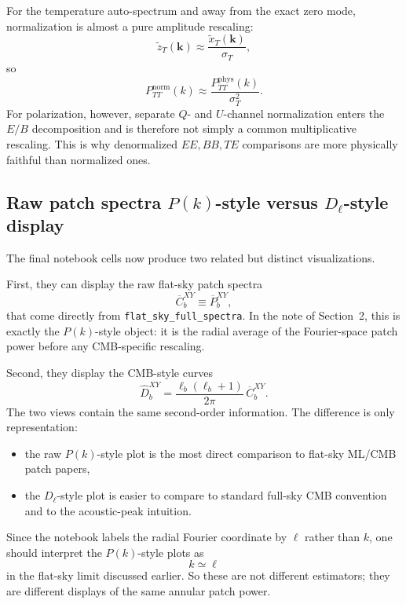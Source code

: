\documentclass[11pt]{article}
\begin{document}
For the temperature auto-spectrum and away from the exact zero mode, normalization is almost a pure amplitude rescaling:
\begin{equation}
  \widetilde z_T(\bm{k})
  \approx
  \frac{\widetilde x_T(\bm{k})}{\sigma_T},
\end{equation}
so
\begin{equation}
  P_{TT}^{\mathrm{norm}}(k)
  \approx
  \frac{P_{TT}^{\mathrm{phys}}(k)}{\sigma_T^2}.
\end{equation}
For polarization, however, separate \(Q\)- and \(U\)-channel normalization enters the \(E/B\) decomposition and is therefore not simply a common multiplicative rescaling. This is why denormalized \(EE,BB,TE\) comparisons are more physically faithful than normalized ones.

\subsection{Raw patch spectra \(P(k)\)-style versus \(D_\ell\)-style display}

The final notebook cells now produce two related but distinct visualizations.

First, they can display the raw flat-sky patch spectra
\begin{equation}
  \overline C_b^{XY}
  \equiv
  \overline P_b^{XY},
\end{equation}
that come directly from \texttt{flat\_sky\_full\_spectra}. In the note of Section~2, this is exactly the \(P(k)\)-style object: it is the radial average of the Fourier-space patch power before any CMB-specific rescaling.

Second, they display the CMB-style curves
\begin{equation}
  \widehat D_b^{XY}
  =
  \frac{\ell_b(\ell_b+1)}{2\pi}\,\overline C_b^{XY}.
\end{equation}
The two views contain the same second-order information. The difference is only representation:
\begin{itemize}[leftmargin=1.5em]
  \item the raw \(P(k)\)-style plot is the most direct comparison to flat-sky ML/CMB patch papers,
  \item the \(D_\ell\)-style plot is easier to compare to standard full-sky CMB convention and to the acoustic-peak intuition.
\end{itemize}

Since the notebook labels the radial Fourier coordinate by \(\ell\) rather than \(k\), one should interpret the \(P(k)\)-style plots as
\begin{equation}
  k \simeq \ell
\end{equation}
in the flat-sky limit discussed earlier. So these are not different estimators; they are different displays of the same annular patch power.
\end{document}
